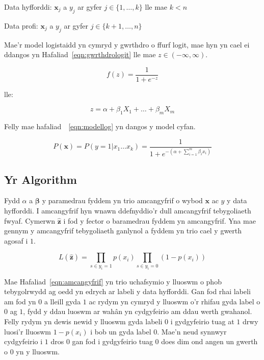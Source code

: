 Data hyfforddi: $\mathbf{x}_j$ a $y_j$ ar gyfer $j \in \{ 1,\dots,k\}$ lle mae $k<n$

Data profi: $\mathbf{x}_j$ a $y_j$ ar gyfer $j \in \{ k+1,\dots,n \}$

Mae'r model logistaidd yn cymryd y gwrthdro o ffurf logit, mae hyn yn cael ei ddangos yn Hafaliad~\ref{eqn:gwrthdrologit} lle mae $z \in (-\infty,\infty)$.

\begin{equation}\label{eqn:gwrthdrologit}	
	f(z) = \frac{1}{1+e^{-z}} 
\end{equation}

lle:

\begin{equation}\label{eqn:cyfernodau} 
    z = \alpha + \beta_{1}X_{1} + \dots + \beta_{m}X_{m} 
\end{equation} 

Felly mae hafaliad~~\ref{eqn:modellog} yn dangos y model cyfan.

\begin{equation}\label{eqn:modellog}
    P(\mathbf{x}) = P(y = 1 | x_1 \dots x_k) = \frac{1}{1+e^{-( \alpha + \sum_{i=1}^{m} \beta_{i}x_{i})}} 
\end{equation}

\subsection{Yr Algorithm}

Fydd $\alpha$ a $\mathbf{\beta}$ y paramedrau fyddem yn trio amcangyfrif o wybod $\mathbf{x}$ ac $y$ y data hyfforddi. I amcangyfrif hyn wnawn ddefnyddio'r dull amcangyfrif tebygoliaeth fwyaf. Cymerwn $\hat{\mathbf{z}}$ i fod y fector o baramedrau fyddem yn amcangyfrif. Yna mae gennym y amcangyfrif tebygoliaeth ganlynol a fyddem yn trio cael y gwerth agosaf i $1$. \cite{Logistic-regression}

\begin{equation}\label{eqn:amcangyfrif}
L(\hat{\mathbf{z}}) = \prod_{s \in y_{i}=1} p(x_i) \prod_{s \in y_{i}=0} (1 - p(x_i))
\end{equation}

Mae Hafaliad~\ref{eqn:amcangyfrif} yn trio uchafsymio y lluoswm o phob tebygolrwydd ag oedd yn edrych ar labeli y data hyfforddi. Gan fod rhai labeli am fod yn $0$ a lleill gyda $1$ ac rydym yn cymryd y lluoswm o'r rhifau gyda label o $0$ ag $1$, fydd y ddau luoswm ar wah\^{a}n yn cydgyfeirio am ddau werth gwahanol. Felly rydym yn dewis newid y lluoswm gyda labeli $0$ i gydgyfeirio tuag at $1$ drwy luosi'r lluoswm $1-p(x_i)$ i bob un gyda label $0$. Mae'n neud synnwyr cydgyfeirio i $1$ dros $0$ gan fod i gydgyfeirio tuag $0$ does dim ond angen un gwerth o $0$ yn y lluoswm. 

